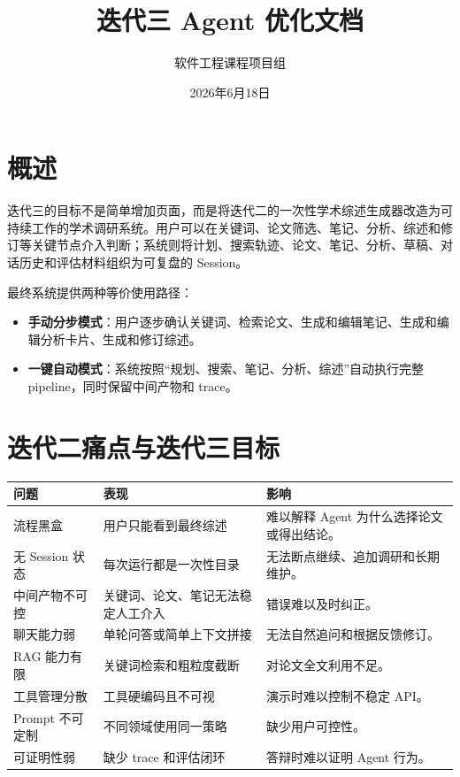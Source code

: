 \documentclass[12pt,a4paper,onecolumn]{ctexart}
\title{\textbf{迭代三 Agent 优化文档}}
\author{软件工程课程项目组}
\date{2026年6月18日}
\begin{document}
\maketitle
\thispagestyle{empty}
\newpage
\tableofcontents
\newpage

\section{概述}

迭代三的目标不是简单增加页面，而是将迭代二的一次性学术综述生成器改造为可持续工作的学术调研系统。用户可以在关键词、论文筛选、笔记、分析、综述和修订等关键节点介入判断；系统则将计划、搜索轨迹、论文、笔记、分析、草稿、对话历史和评估材料组织为可复盘的 Session。

最终系统提供两种等价使用路径：
\begin{itemize}[leftmargin=2em]
  \item \textbf{手动分步模式}：用户逐步确认关键词、检索论文、生成和编辑笔记、生成和编辑分析卡片、生成和修订综述。
  \item \textbf{一键自动模式}：系统按照“规划、搜索、笔记、分析、综述”自动执行完整 pipeline，同时保留中间产物和 trace。
\end{itemize}

\section{迭代二痛点与迭代三目标}

\begin{longtable}{p{3.2cm}p{5.0cm}p{5.2cm}}
\toprule
\textbf{问题} & \textbf{表现} & \textbf{影响} \\
\midrule
流程黑盒 & 用户只能看到最终综述 & 难以解释 Agent 为什么选择论文或得出结论。\\
无 Session 状态 & 每次运行都是一次性目录 & 无法断点继续、追加调研和长期维护。\\
中间产物不可控 & 关键词、论文、笔记无法稳定人工介入 & 错误难以及时纠正。\\
聊天能力弱 & 单轮问答或简单上下文拼接 & 无法自然追问和根据反馈修订。\\
RAG 能力有限 & 关键词检索和粗粒度截断 & 对论文全文利用不足。\\
工具管理分散 & 工具硬编码且不可视 & 演示时难以控制不稳定 API。\\
Prompt 不可定制 & 不同领域使用同一策略 & 缺少用户可控性。\\
可证明性弱 & 缺少 trace 和评估闭环 & 答辩时难以证明 Agent 行为。\\
\bottomrule
\end{longtable}
\end{document}

